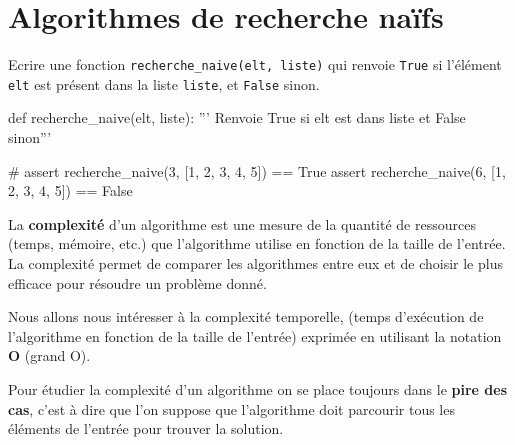 \def\level{Première}  %
\def\course{NSI}
\def\chaptername{Algorithmes de recherche} %
\def\docname{LP06}        %

\pagestyle{cours_FP}
\makeheader{} %

\section{Algorithmes de recherche naïfs}


\begin{exercice_cours}{}
	Ecrire une fonction \texttt{recherche\_naive(elt, liste)} qui renvoie \texttt{True} si l'élément \texttt{elt} est présent dans la liste \texttt{liste}, et \texttt{False} sinon.
	\begin{CodePythontexAlt}[Largeur=1\linewidth,Centre,PremLigne=1, Lignes=false]{}		
def recherche_naive(elt, liste):
	''' Renvoie True si elt est dans liste et False sinon'''









	#
assert recherche_naive(3, [1, 2, 3, 4, 5]) == True
assert recherche_naive(6, [1, 2, 3, 4, 5]) == False
		\end{CodePythontexAlt}
\end{exercice_cours}


\begin{definition}{}
	La \textbf{complexité} d'un algorithme est une mesure de la quantité de ressources (temps, mémoire, etc.) que l'algorithme utilise en fonction de la taille de l'entrée. La complexité permet de comparer les algorithmes entre eux et de choisir le plus efficace pour résoudre un problème donné.	

	Nous allons nous intéresser à la complexité temporelle, (temps d'exécution de l'algorithme en fonction de la taille de l'entrée) exprimée en utilisant la notation \textbf{O} (grand O).
	
	Pour étudier la complexité d'un algorithme on se place toujours dans le \textbf{pire des cas}, c'est à dire que l'on suppose que l'algorithme doit parcourir tous les éléments de l'entrée pour trouver la solution.
\end{definition}

